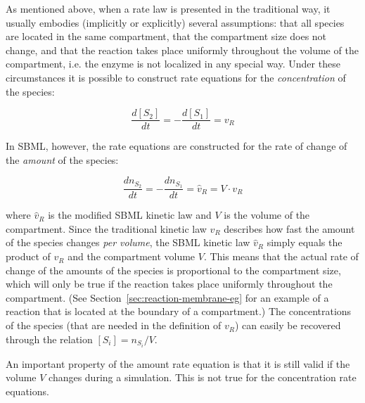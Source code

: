 As mentioned above, when a rate law is presented in the
traditional way, it usually embodies (implicitly or explicitly)
several assumptions: that all species are located in the same
compartment, that the compartment size does not change, and that
the reaction takes place uniformly throughout the volume of the
compartment, i.e. the enzyme is not localized in any special way.
Under these circumstances it is possible to construct rate
equations for the \emph{concentration} of the species:
\begin{linenomath}
  \begin{equation*}
    \frac{d[S_{2}]}{dt} = -\frac{d[S_{1}]}{dt} = v_{R}
  \end{equation*}
\end{linenomath}
In SBML, however, the rate equations are constructed for the rate
of change of the \emph{amount} of the species:
\begin{linenomath}
  \begin{equation*}
    \frac{dn_{S_{2}}}{dt} = -\frac{dn_{S_{1}}}{dt} = \hat{v}_{R} = V \cdot v_{R}
  \end{equation*}
\end{linenomath}
where $\hat{v}_{R}$ is the modified SBML kinetic law and $V$ is
the volume of the compartment.  Since the traditional kinetic law
$v_{R}$ describes how fast the amount of the species changes
\emph{per volume}, the SBML kinetic law $\hat{v}_{R}$ simply
equals the product of $v_{R}$ and the compartment volume $V$. This
means that the actual rate of change of the amounts of the species
is proportional to the compartment size, which will only be true
if the reaction takes place uniformly throughout the compartment.
(See Section~\ref{sec:reaction-membrane-eg} for an example of a
reaction that is located at the boundary of a compartment.)  The
concentrations of the species (that are needed in the definition
of $v_{R}$) can easily be recovered through the relation
$[S_{i}]=n_{S_{i}}/V$.

An important property of the amount rate equation is that it is still
valid if the volume $V$ changes during a simulation. This is not
true for the concentration rate equations. 

